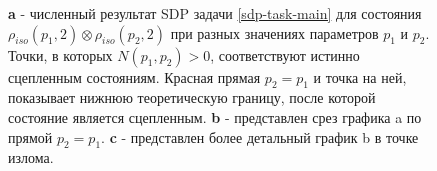 \begin{figure}
    \caption{
    \textbf{a} - численный результат SDP задачи \ref{sdp-task-main} для состояния $\rho_{iso}(p_1,2) \otimes \rho_{iso}(p_2,2)$ при разных значениях параметров $p_1$ и $p_2$. Точки, в которых $N(p_1, p_2) > 0$, соответствуют истинно сцепленным состояниям. Красная прямая $p_2 = p_1$ и точка на ней, показывает нижнюю теоретическую границу, после которой состояние является сцепленным.
    \textbf{b} - представлен срез графика a по прямой $p_2 = p_1$.
    \textbf{c} - представлен более детальный график b в точке излома.}
    \label{img:2-isotropic}
\end{figure}

